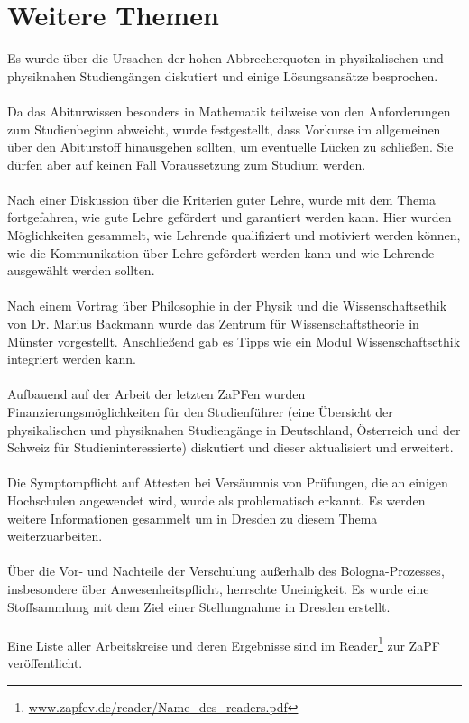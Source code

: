 \section*{Weitere Themen}
Es wurde über die Ursachen der hohen Abbrecherquoten in physikalischen und 
physiknahen Studiengängen diskutiert und einige Lösungsansätze besprochen.
\\ \\
Da das Abiturwissen besonders in Mathematik teilweise von den Anforderungen 
zum Studienbeginn abweicht, wurde festgestellt, dass Vorkurse im allgemeinen 
über den Abiturstoff hinausgehen sollten, um eventuelle Lücken zu schließen. 
Sie dürfen aber auf keinen Fall Voraussetzung zum Studium werden.
\\ \\
Nach einer Diskussion über die Kriterien guter Lehre, wurde mit dem 
Thema fortgefahren, wie gute Lehre gefördert und garantiert werden kann. Hier 
wurden Möglichkeiten gesammelt, wie Lehrende qualifiziert und motiviert werden 
können, wie die Kommunikation über Lehre gefördert werden kann und wie Lehrende 
ausgewählt werden sollten.
\\ \\
Nach einem Vortrag über Philosophie in der Physik und die Wissenschaftsethik 
von Dr. Marius Backmann wurde das Zentrum für Wissenschaftstheorie in Münster
vorgestellt. Anschließend gab es Tipps wie ein Modul Wissenschaftsethik integriert werden kann.
\\ \\
Aufbauend auf der Arbeit der letzten ZaPFen wurden Finanzierungsmöglichkeiten 
für den Studienführer (eine Übersicht der physikalischen und physiknahen 
Studiengänge in Deutschland, Österreich und der Schweiz für 
Studieninteressierte) diskutiert und dieser aktualisiert und erweitert.
\\ \\
Die Symptompflicht auf Attesten bei Versäumnis von Prüfungen, die an einigen 
Hochschulen angewendet wird, wurde als problematisch erkannt. Es werden weitere 
Informationen gesammelt um in Dresden zu diesem Thema weiterzuarbeiten.
\\ \\
Über die Vor- und Nachteile der Verschulung außerhalb des Bologna-Prozesses, 
insbesondere über Anwesenheitspflicht, herrschte Uneinigkeit. Es wurde eine 
Stoffsammlung mit dem Ziel einer Stellungnahme in Dresden erstellt.
\\ \\
Eine Liste aller Arbeitskreise und deren Ergebnisse sind im
Reader\footnote{\href{http://www.zapfev.de/reader/Name_des_readers.pdf}{\url{www.zapfev.de/reader/Name_des_readers.pdf}}}
zur ZaPF veröffentlicht.

